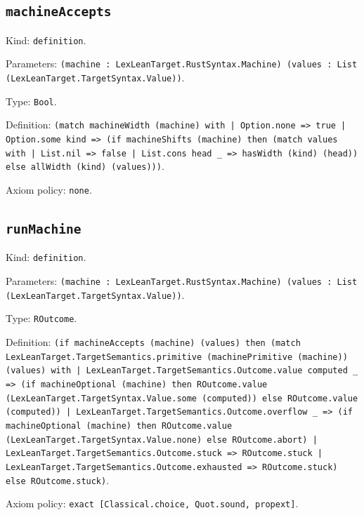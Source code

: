 \documentclass[11pt]{article}
\begin{document}
\subsection*{\texttt{machineAccepts}}
\noindent Kind: \texttt{definition}.\par
\noindent Parameters: \texttt{(machine : LexLeanTarget.RustSyntax.Machine) (values : List (LexLeanTarget.TargetSyntax.Value))}.\par
\noindent Type: \texttt{Bool}.\par
\noindent Definition: \texttt{(match machineWidth (machine) with | Option.none => true | Option.some kind => (if machineShifts (machine) then (match values with | List.nil => false | List.cons head \_ => hasWidth (kind) (head)) else allWidth (kind) (values)))}.\par
\noindent Axiom policy: \texttt{none}.\par
\subsection*{\texttt{runMachine}}
\noindent Kind: \texttt{definition}.\par
\noindent Parameters: \texttt{(machine : LexLeanTarget.RustSyntax.Machine) (values : List (LexLeanTarget.TargetSyntax.Value))}.\par
\noindent Type: \texttt{ROutcome}.\par
\noindent Definition: \texttt{(if machineAccepts (machine) (values) then (match LexLeanTarget.TargetSemantics.primitive (machinePrimitive (machine)) (values) with | LexLeanTarget.TargetSemantics.Outcome.value computed \_ => (if machineOptional (machine) then ROutcome.value (LexLeanTarget.TargetSyntax.Value.some (computed)) else ROutcome.value (computed)) | LexLeanTarget.TargetSemantics.Outcome.overflow \_ => (if machineOptional (machine) then ROutcome.value (LexLeanTarget.TargetSyntax.Value.none) else ROutcome.abort) | LexLeanTarget.TargetSemantics.Outcome.stuck => ROutcome.stuck | LexLeanTarget.TargetSemantics.Outcome.exhausted => ROutcome.stuck) else ROutcome.stuck)}.\par
\noindent Axiom policy: \texttt{exact [Classical.choice, Quot.sound, propext]}.\par
\end{document}
